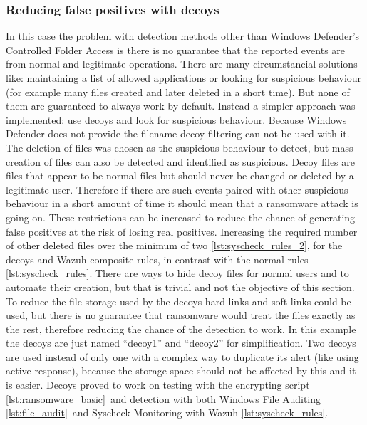 \subsubsection{Reducing false positives with decoys}
In this case the problem with detection methods other than Windows Defender's Controlled Folder Access is there is no guarantee that the reported events are from normal and legitimate operations.
There are many circumstancial solutions like: maintaining a list of allowed applications or looking for suspicious behaviour (for example many files created and later deleted in a short time).
But none of them are guaranteed to always work by default.
Instead a simpler approach was implemented: use decoys and look for suspicious behaviour.
Because Windows Defender does not provide the filename decoy filtering can not be used with it.
\linej
The deletion of files was chosen as the suspicious behaviour to detect, but mass creation of files can also be detected and identified as suspicious.
\linej
\linej
Decoy files are files that appear to be normal files but should never be changed or deleted by a legitimate user.
Therefore if there are such events paired with other suspicious behaviour in a short amount of time it should mean that a ransomware attack is going on.
\linej
These restrictions can be increased to reduce the chance of generating false positives at the risk of losing real positives.
Increasing the required number of other deleted files over the minimum of two \ref{lst:syscheck_rules_2}, for the decoys and Wazuh composite rules, in contrast with the normal rules \ref{lst:syscheck_rules}.
\linej
There are ways to hide decoy files for normal users and to automate their creation, but that is trivial and not the objective of this section.
To reduce the file storage used by the decoys hard links and soft links could be used, but there is no guarantee that ransomware would treat the files exactly as the rest, therefore reducing the chance of the detection to work.
\linej
In this example the decoys are just named ``decoy1'' and ``decoy2'' for simplification.
Two decoys are used instead of only one with a complex way to duplicate its alert (like using active response), because the storage space should not be affected by this and it is easier.
\linej
\linej
Decoys proved to work on testing with the encrypting script \ref{lst:ransomware_basic}\ and detection with both Windows File Auditing \ref{lst:file_audit}\ and Syscheck Monitoring with Wazuh \ref{lst:syscheck_rules}.

